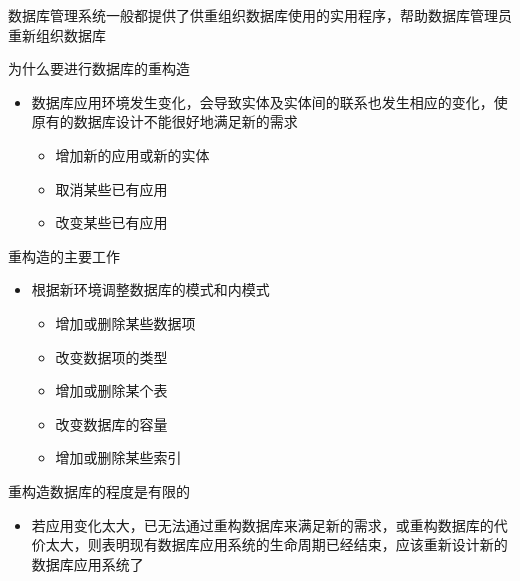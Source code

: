 数据库管理系统一般都提供了供重组织数据库使用的实用程序，帮助数据库管理员重新组织数据库

为什么要进行数据库的重构造
\begin{itemize}
    \item 数据库应用环境发生变化，会导致实体及实体间的联系也发生相应的变化，使原有的数据库设计不能很好地满足新的需求
    \vspace{-0.8em}
    \begin{multicols}{3}
        \begin{itemize}
            \item 增加新的应用或新的实体
            \item 取消某些已有应用
            \item 改变某些已有应用
        \end{itemize}
    \end{multicols}
    \vspace{-1em}
\end{itemize}

重构造的主要工作
\begin{itemize}
    \item 根据新环境调整数据库的模式和内模式
    \vspace{-0.8em}
    \begin{multicols}{3}
        \begin{itemize}
            \item 增加或删除某些数据项
            \item 改变数据项的类型
            \item 增加或删除某个表
            \item 改变数据库的容量
            \item 增加或删除某些索引
        \end{itemize}
    \end{multicols}
    \vspace{-1em}
\end{itemize}

重构造数据库的程度是有限的
\begin{itemize}
    \item 若应用变化太大，已无法通过重构数据库来满足新的需求，或重构数据库的代价太大，则表明现有数据库应用系统的生命周期已经结束，应该重新设计新的数据库应用系统了
\end{itemize}
